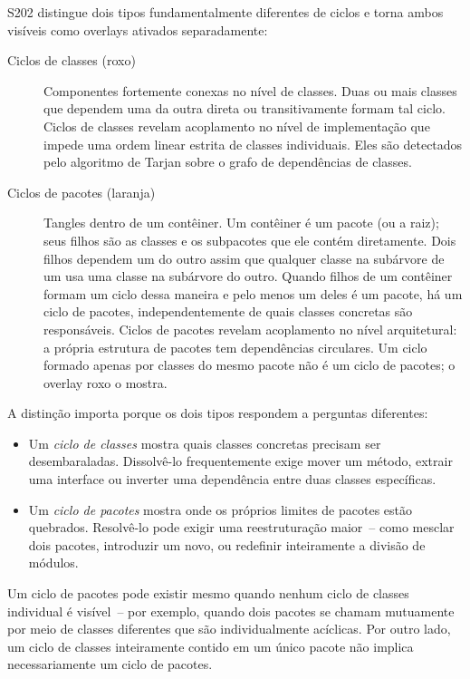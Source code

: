 \documentclass[a4paper,11pt]{article}
\begin{document}
S202 distingue dois tipos fundamentalmente diferentes de ciclos e torna ambos
vis\'iveis como overlays ativados separadamente:

\begin{description}
  \item[Ciclos de classes (roxo)] Componentes fortemente conexas no n\'ivel
        de classes. Duas ou mais classes que dependem uma da outra direta ou
        transitivamente formam tal ciclo. Ciclos de classes revelam acoplamento
        no n\'ivel de implementa\c{c}\~ao que impede uma ordem linear estrita de
        classes individuais. Eles s\~ao detectados pelo algoritmo de Tarjan sobre
        o grafo de depend\^encias de classes.
  \item[Ciclos de pacotes (laranja)] Tangles dentro de um cont\^einer. Um
        cont\^einer \'e um pacote (ou a raiz); seus filhos s\~ao as classes e
        os subpacotes que ele cont\'em diretamente. Dois filhos dependem um do
        outro assim que qualquer classe na sub\'arvore de um usa uma classe na
        sub\'arvore do outro. Quando filhos de um cont\^einer formam um ciclo
        dessa maneira e pelo menos um deles \'e um pacote, h\'a um ciclo de
        pacotes, independentemente de quais classes concretas s\~ao
        respons\'aveis. Ciclos de pacotes revelam acoplamento no n\'ivel
        arquitetural: a pr\'opria estrutura de pacotes tem depend\^encias
        circulares. Um ciclo formado apenas por classes do mesmo pacote n\~ao
        \'e um ciclo de pacotes; o overlay roxo o mostra.
\end{description}

A distin\c{c}\~ao importa porque os dois tipos respondem a perguntas diferentes:

\begin{itemize}
  \item Um \emph{ciclo de classes} mostra quais classes concretas precisam ser
        desembaraladas. Dissolv\^e-lo frequentemente exige mover um m\'etodo,
        extrair uma interface ou inverter uma depend\^encia entre duas classes
        espec\'ificas.
  \item Um \emph{ciclo de pacotes} mostra onde os pr\'oprios limites de pacotes
        est\~ao quebrados. Resolv\^e-lo pode exigir uma reestrutura\c{c}\~ao
        maior~-- como mesclar dois pacotes, introduzir um novo, ou redefinir
        inteiramente a divis\~ao de m\'odulos.
\end{itemize}

Um ciclo de pacotes pode existir mesmo quando nenhum ciclo de classes individual
\'e vis\'ivel~-- por exemplo, quando dois pacotes se chamam mutuamente por meio
de classes diferentes que s\~ao individualmente ac\'iclicas. Por outro lado, um
ciclo de classes inteiramente contido em um \'unico pacote n\~ao implica
necessariamente um ciclo de pacotes.
\end{document}
